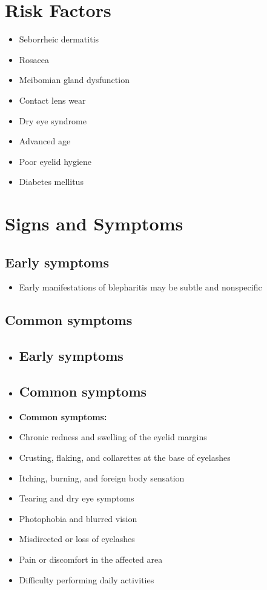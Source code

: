 \section{Risk Factors}

\begin{itemize}[noitemsep]
  \item Seborrheic dermatitis
  \item Rosacea
  \item Meibomian gland dysfunction
  \item Contact lens wear
  \item Dry eye syndrome
  \item Advanced age
  \item Poor eyelid hygiene
  \item Diabetes mellitus
\end{itemize}

\section{Signs and Symptoms}

\subsection{Early symptoms}
\begin{itemize}[noitemsep]
  \item Early manifestations of blepharitis may be subtle and nonspecific
\end{itemize}

\subsection{Common symptoms}
\begin{itemize}[noitemsep]
  \item \subsection{Early symptoms}
  \item \subsection{Common symptoms}
  \item \textbf{Common symptoms:}
  \item Chronic redness and swelling of the eyelid margins
  \item Crusting, flaking, and collarettes at the base of eyelashes
  \item Itching, burning, and foreign body sensation
  \item Tearing and dry eye symptoms
  \item Photophobia and blurred vision
  \item Misdirected or loss of eyelashes
  \item Pain or discomfort in the affected area
  \item Difficulty performing daily activities
\end{itemize}

